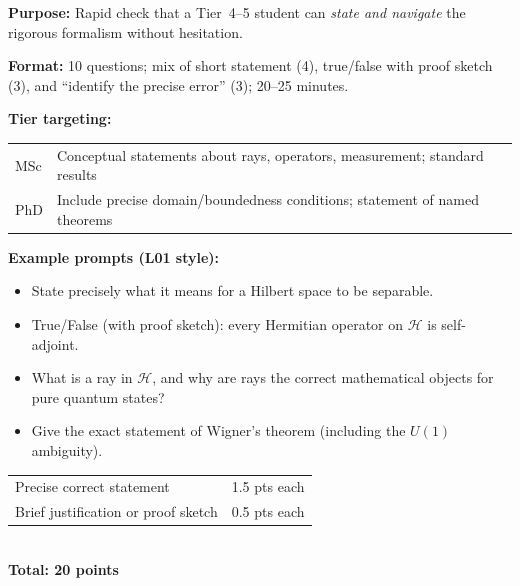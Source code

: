 \documentclass[11pt,a4paper]{article}
\begin{document}
\begin{tcolorbox}[gradconceptbox, title={SCQG --- Simple Concept Questions, Graduate \hfill\normalfont 10 questions}]

\textbf{Purpose:} Rapid check that a Tier~4--5 student can \emph{state and navigate}
the rigorous formalism without hesitation.

\medskip\textbf{Format:} 10 questions; mix of short statement (4), true/false with proof
sketch (3), and ``identify the precise error'' (3); 20--25 minutes.

\medskip\textbf{Tier targeting:}
\begin{center}
\begin{tabular}{lp{9cm}}
\toprule
MSc & Conceptual statements about rays, operators, measurement; standard results\\
PhD & Include precise domain/boundedness conditions; statement of named theorems\\
\bottomrule
\end{tabular}
\end{center}

\medskip\textbf{Example prompts (L01 style):}
\begin{itemize}[leftmargin=1.5em,itemsep=2pt]
  \item State precisely what it means for a Hilbert space to be separable.
  \item True/False (with proof sketch): every Hermitian operator on $\mathcal{H}$ is
        self-adjoint.
  \item What is a ray in $\mathcal{H}$, and why are rays the correct mathematical objects
        for pure quantum states?
  \item Give the exact statement of Wigner's theorem (including the $U(1)$ ambiguity).
\end{itemize}
\end{tcolorbox}

\begin{tcolorbox}[rubricbox, title={SCQG Rubric}]
\begin{tabular}{ll}
  Precise correct statement       & 1.5 pts each\\
  Brief justification or proof sketch & 0.5 pts each\\
\end{tabular}\\[4pt]
\textbf{Total: 20 points}
\end{tcolorbox}

\bigskip
\end{document}
